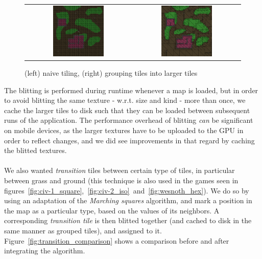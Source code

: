 \begin{figure}[H]
    \centering
    \begin{tabular}{cc}
        \includegraphics[width=0.5\textwidth]{figures/generating_levels/naive-tile.png}
        &
        \includegraphics[width=0.5\textwidth]{figures/generating_levels/grouped-tile.png}
    \end{tabular}
    \caption{(left) naive tiling, (right) grouping tiles into larger tiles}\label{fig:grouped_tiling_comparison}
\end{figure}

The blitting is performed during runtime whenever a map is loaded, but in order
to avoid blitting the same texture - w.r.t. size and kind - more than once, we
cache the larger tiles to disk such that they can be loaded between subsequent
runs of the application. The performance overhead of blitting \textit{can} be
significant on mobile devices, as the larger textures have to be uploaded to
the GPU in order to reflect changes, and we did see improvements in that regard
by caching the blitted textures.
\\
\\
We also wanted \textit{transition} tiles between certain type of tiles, in
particular between grass and ground (this technique is also used in the games
seen in
figures~\ref{fig:civ-1_square},~\ref{fig:civ-2_iso}~and~\ref{fig:wesnoth_hex}).
We do so by using an adaptation of the \textit{Marching squares} algorithm, and
mark a position in the map as a particular type, based on the values of its
neighbors. A corresponding \textit{transition tile} is then blitted together
(and cached to disk in the same manner as grouped tiles), and assigned to it.
Figure~\ref{fig:transition_comparison} shows a comparison before and after
integrating the algorithm.

